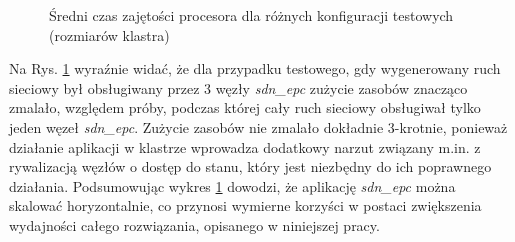 \begin{figure}[h]
\centering
{}
\caption{Średni czas zajętości procesora dla różnych konfiguracji testowych
  (rozmiarów klastra)}
\label{plot:cpu_usage}
\end{figure}

Na Rys. \ref{plot:cpu_usage} wyraźnie widać, że dla przypadku testowego, gdy
wygenerowany ruch sieciowy był obsługiwany przez 3 węzły \textit{sdn\_epc}
zużycie zasobów znacząco zmalało, względem próby, podczas której cały ruch
sieciowy obsługiwał tylko jeden węzeł \textit{sdn\_epc}. Zużycie zasobów nie
zmalało dokładnie 3-krotnie, ponieważ działanie aplikacji w klastrze wprowadza
dodatkowy narzut związany m.in. z rywalizacją węzłów o dostęp do stanu, który
jest niezbędny do ich poprawnego działania. Podsumowując wykres
\ref{plot:cpu_usage} dowodzi, że aplikację \textit{sdn\_epc} można skalować
horyzontalnie, co przynosi wymierne korzyści w postaci zwiększenia wydajności
całego rozwiązania, opisanego w niniejszej pracy.
